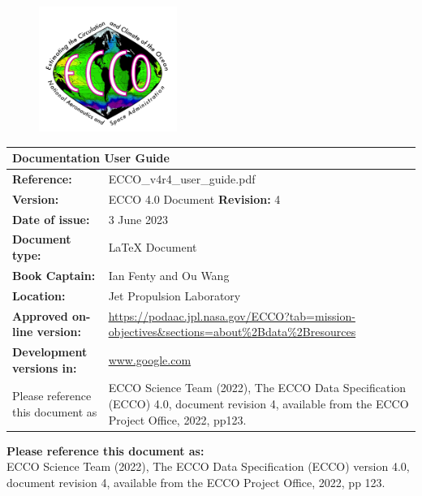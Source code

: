 \begin{figure}[t] %
  \centering %
  \includegraphics[width=0.4\textwidth]{../images/ecco_logo_800_726.png} %
  \end{figure}
  \maketitle
  
\begin{center}
    \begin{tabular}{|p{2in}|p{4in}|}
    \hline
    \multicolumn{2}{|l|}{\textbf{Documentation User Guide}} \\
    \hline
    \textbf{Reference:} & ECCO\_v4r4\_user\_guide.pdf \\
    \hline
    \textbf{Version:} & ECCO 4.0 Document \textbf{Revision:} 4 \\
    \hline
    \textbf{Date of issue:} & 3 June 2023 \\
    \hline
    \textbf{Document type:} & \LaTeX{} Document \\
    \hline
    \textbf{Book Captain:} & Ian Fenty and Ou Wang \\
    \hline
    \textbf{Location:} & Jet Propulsion Laboratory \\
    \hline
    \textbf{Approved on-line version:} & \url{https://podaac.jpl.nasa.gov/ECCO?tab=mission-objectives\&sections=about\%2Bdata\%2Bresources} \\
    \hline
    \textbf{Development versions in:} & \url{www.google.com} \\
    \hline
    Please reference this document as & ECCO Science Team (2022), The ECCO Data Specification (ECCO) 4.0, document revision 4, available from the ECCO  Project Office, 2022, pp123. \\
    \hline
  \end{tabular}
  \end{center}
  
  \textbf{Please reference this document as:}\\
  ECCO Science Team (2022), The ECCO Data Specification (ECCO) version 4.0,\\
  document revision 4, available from the ECCO Project Office, 2022, pp 123.
  
  \newpage
  \mbox{}